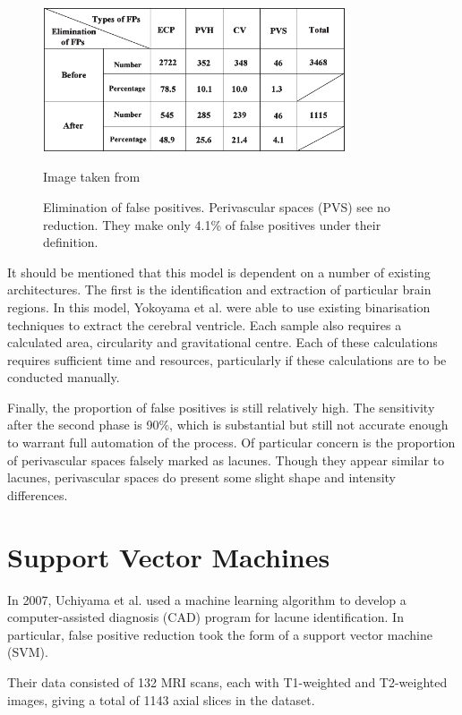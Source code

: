 \begin{figure}[ht]
	\centering
	\includegraphics[width=0.8\textwidth]{Images/4_yokoyama2007testing.png}
	\caption{Elimination of false positives. Perivascular spaces (PVS) see no reduction. They make only 4.1\% of false positives under their definition.}
	\small Image taken from \cite{Yokoyama2007}
\end{figure}

It should be mentioned that this model is dependent on a number of existing architectures. The first is the identification and extraction of particular brain regions. In this model, Yokoyama et al. were able to use existing binarisation techniques to extract the cerebral ventricle. Each sample also requires a calculated area, circularity and gravitational centre. Each of these calculations requires sufficient time and resources, particularly if these calculations are to be conducted manually.

Finally, the proportion of false positives is still relatively high. The sensitivity after the second phase is 90\%, which is substantial but still not accurate enough to warrant full automation of the process. Of particular concern is the proportion of perivascular spaces falsely marked as lacunes. Though they appear similar to lacunes, perivascular spaces do present some slight shape and intensity differences.


\section{Support Vector Machines}

In 2007, Uchiyama et al. \cite{Uchiyama20071554} used a machine learning algorithm to develop a computer-assisted diagnosis (CAD) program for lacune identification. In particular, false positive reduction took the form of a support vector machine (SVM).

Their data consisted of 132 MRI scans, each with T1-weighted and T2-weighted images, giving a total of 1143 axial slices in the dataset. 

